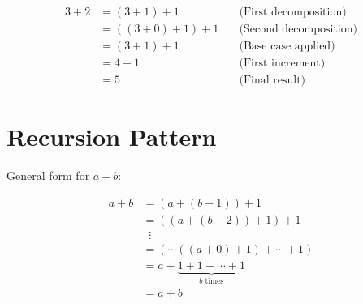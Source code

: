 \documentclass{article}
\begin{document}
\[
    \begin{aligned}
        3 + 2 & = (3 + 1) + 1 \quad       & \text{(First decomposition)}  \\
              & = ((3 + 0) + 1) + 1 \quad & \text{(Second decomposition)} \\
              & = (3 + 1) + 1 \quad       & \text{(Base case applied)}    \\
              & = 4 + 1 \quad             & \text{(First increment)}      \\
              & = 5 \quad                 & \text{(Final result)}
    \end{aligned}
\]

\section*{Recursion Pattern}
General form for \(a + b\):

\[
    \begin{aligned}
        a + b & = (a + (b-1)) + 1                                       \\
              & = ((a + (b-2)) + 1) + 1                                 \\
              & \;\;\vdots                                              \\
              & = (\cdots((a + 0) + 1) + \cdots + 1)                    \\
              & = a + \underbrace{1 + 1 + \cdots + 1}_{b \text{ times}} \\
              & = a + b
    \end{aligned}
\]
\end{document}
